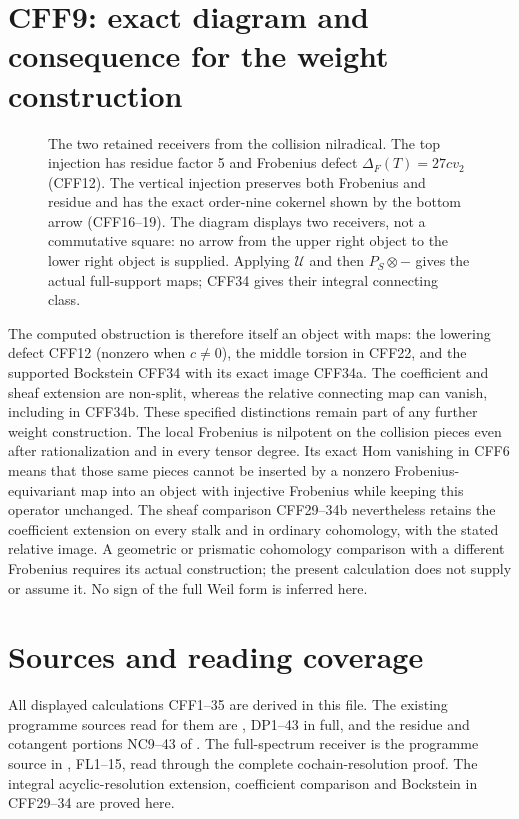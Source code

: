 \section{CFF9: exact diagram and consequence for the weight construction}
\begin{figure}[ht]
\centering
{}
\caption{The two retained receivers from the collision nilradical.
The top injection has residue factor 5 and Frobenius defect
\(\Delta_F(T)=27cv_2\) (CFF12). The vertical injection preserves
both Frobenius and residue and has the exact order-nine cokernel
shown by the bottom arrow (CFF16--19). The diagram displays two
receivers, not a commutative square: no arrow from the upper
right object to the lower right object is supplied. Applying
\(\mathcal U\) and then \(P_S\otimes-\) gives the actual full-support
maps; CFF34 gives their integral connecting class.}
\end{figure}

The computed obstruction is therefore itself an object with
maps: the lowering defect CFF12 (nonzero when \(c\ne0\)),
the middle torsion in CFF22, and the supported Bockstein
CFF34 with its exact image CFF34a. The coefficient and
sheaf extension are non-split, whereas the relative
connecting map can vanish, including in CFF34b.
These specified distinctions remain part of any further
weight construction. The local Frobenius is nilpotent on
the collision pieces even after rationalization and in
every tensor degree. Its exact Hom vanishing in CFF6
means that those same pieces cannot be inserted by a
nonzero Frobenius-equivariant map into an object with
injective Frobenius while keeping this operator unchanged.
The sheaf comparison CFF29--34b nevertheless retains
the coefficient extension on every stalk and in ordinary
cohomology, with the stated relative image. A geometric or prismatic cohomology
comparison with a different Frobenius requires its actual
construction; the present calculation does not supply or
assume it. No sign of the full Weil form is inferred here.

\section*{Sources and reading coverage}
All displayed calculations CFF1--35 are derived in this file.
The existing programme sources read for them are
,
DP1--43 in full, and the residue and cotangent portions
NC9--43 of
.
The full-spectrum receiver is the programme source
in ,
FL1--15, read through the complete cochain-resolution proof.
The integral acyclic-resolution extension, coefficient
comparison and Bockstein in CFF29--34 are proved here.

